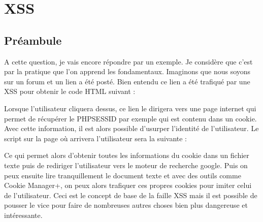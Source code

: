 \documentclass{article}
\begin{document}
\newpage
\section{XSS}
\subsection{Préambule}
A cette question, je vais encore répondre par un exemple. Je considère que c'est par la pratique que l'on apprend les fondamentaux. Imaginons que nous soyons sur un forum et un lien a été posté. Bien entendu ce lien a été trafiqué par une XSS pour obtenir le code HTML suivant :
\vspace{0.2cm}\\
\vspace{0.2cm}

Lorsque l'utilisateur cliquera dessus, ce lien le dirigera vers une page internet qui permet de récupérer le PHPSESSID par exemple qui est contenu dans un cookie. Avec cette information, il est alors possible d'usurper l'identité de l'utilisateur. Le script sur la page où arrivera l'utilisateur sera la suivante :
\vspace{0.2cm}\\
\vspace{0.2cm}

Ce qui permet alors d'obtenir toutes les informations du cookie dans un fichier texte puis de rediriger l'utilisateur vers le moteur de recherche google. Puis on peux ensuite lire tranquillement le document texte et avec des outils comme Cookie Manager+, on peux alors trafiquer ces propres cookies pour imiter celui de l'utilisateur. Ceci est le concept de base de la faille XSS mais il est possible de pousser le vice pour faire de nombreuses autres choses bien plus dangereuse et intéressante.\\
\end{document}
